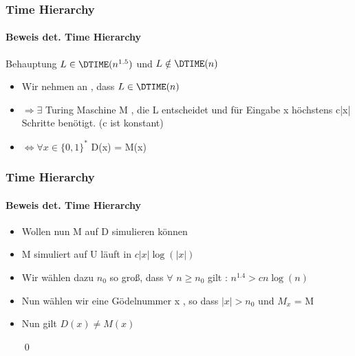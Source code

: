 \begin{frame}
	\frametitle{Time Hierarchy}
	\framesubtitle{Beweis det. Time Hierarchy}
	\begin{KITblock}{Behauptung}
		$L \in \DTIME(n^{1.5})$ und $L \notin \DTIME(n)$
	\end{KITblock}
	\pause
	\begin{itemize}[<+->]
		\item Wir nehmen an , dass $L \in \DTIME(n)$
		\item $\Rightarrow \exists$ Turing Maschine M , die L entscheidet und für Eingabe x
		 		höchstens c|x| Schritte benötigt. (c ist konstant)
		\item $\Leftrightarrow \forall x \in {\lbrace 0,1 \rbrace }^{*}$ D(x) = M(x)
	\end{itemize}
\end{frame}

\begin{frame}
	\frametitle{Time Hierarchy}
	\framesubtitle{Beweis det. Time Hierarchy}
	\begin{itemize}[<+->]
		\item Wollen nun M auf D simulieren können
		\item M simuliert auf U läuft in $c|x|\log(|x|)$
		\item Wir wählen dazu $n_0$ so groß, dass $\forall$ $n \geq n_0$ gilt :
			$n^{1.4} > cn\log(n)$		
		\item Nun wählen wir eine Gödelnummer x , so dass $|x| > n_0$ und $M_x$ = M
		\item Nun gilt $D(x) \neq M(x)$ 
		
		\qed 
	\end{itemize}
\end{frame}

